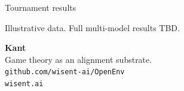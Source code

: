 \documentclass[aspectratio=169]{beamer}
\begin{document}
\begin{frame}{Tournament results}
\centering
\resizebox{0.78\textwidth}{!}{}
\vspace{4pt}

{\small\color{WLegend}Illustrative data. Full multi-model results TBD.}
\end{frame}

\begin{frame}[plain]
\vfill
\begin{center}
{\fontsize{36}{40}\selectfont\color{WAccent}\bfseries Kant}\\[10pt]
{\color{WLegend}Game theory as an alignment substrate.}\\[24pt]
{\small\color{WLegend}\texttt{github.com/wisent-ai/OpenEnv}\\[4pt]
\texttt{wisent.ai}}
\end{center}
\vfill
\end{frame}
\end{document}
